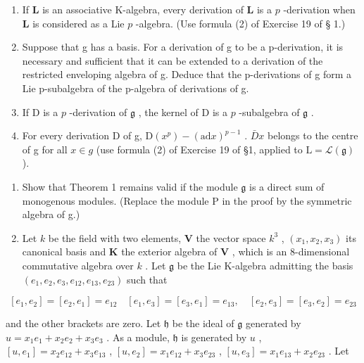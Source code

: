 \begin{enumerate}
\def\labelenumi{(\alph{enumi})}
\item
  If \(\mathbf{L}\) is an associative K-algebra, every derivation of \(\mathbf{L}\) is a \(p\) -derivation when \(\mathbf{L}\) is considered as a Lie \(p\) -algebra. (Use formula (2) of Exercise 19 of § 1.)
\item
  Suppose that g has a basis. For a derivation of g to be a p-derivation, it is necessary and sufficient that it can be extended to a derivation of the restricted enveloping algebra of g. Deduce that the p-derivations of g form a Lie p-subalgebra of the p-algebra of derivations of g.
\item
  If D is a \(p\) -derivation of \(\mathfrak{g}\) , the kernel of D is a \(p\) -subalgebra of \(\mathfrak{g}\) .
\item
  For every derivation D of g, \(\mathrm{D}(x^{p}) - (\mathrm{ad} x)^{p-1}\) . \(\bar{D}x\) belongs to the centre of g for all \(x \in g\) (use formula (2) of Exercise 19 of §1, applied to \(\mathrm{L} = \mathcal{L}(\mathfrak{g})\) ).
\end{enumerate}

\begin{enumerate}
\def\labelenumi{\arabic{enumi}.}
\setcounter{enumi}{7}
\item
  Show that Theorem 1 remains valid if the module \(\mathfrak{g}\) is a direct sum of monogenous modules. (Replace the module P in the proof by the symmetric algebra of g.)
\item
  Let \(k\) be the field with two elements, \(\mathbf{V}\) the vector space \(k^3\) , \((x_1, x_2, x_3)\) its canonical basis and \(\mathbf{K}\) the exterior algebra of \(\mathbf{V}\) , which is an 8-dimensional commutative algebra over \(k\) . Let \(\mathfrak{g}\) be the Lie K-algebra admitting the basis \((e_1, e_2, e_3, e_{12}, e_{13}, e_{23})\) such that
\end{enumerate}

\[
\left[ e _ {1}, e _ {2} \right] = \left[ e _ {2}, e _ {1} \right] = e _ {1 2} \quad \left[ e _ {1}, e _ {3} \right] = \left[ e _ {3}, e _ {1} \right] = e _ {1 3}, \quad \left[ e _ {2}, e _ {3} \right] = \left[ e _ {3}, e _ {2} \right] = e _ {2 3}
\]

and the other brackets are zero. Let \(\mathfrak{h}\) be the ideal of \(\mathfrak{g}\) generated by \(u = x_{1}e_{1} + x_{2}e_{2} + x_{3}e_{3}\) . As a module, \(\mathfrak{h}\) is generated by \(u\) , \([u, e_1] = x_2e_{12} + x_3e_{13}\) , \([u, e_2] = x_1e_{12} + x_3e_{23}\) , \([u, e_3] = x_1e_{13} + x_2e_{23}\) . Let


